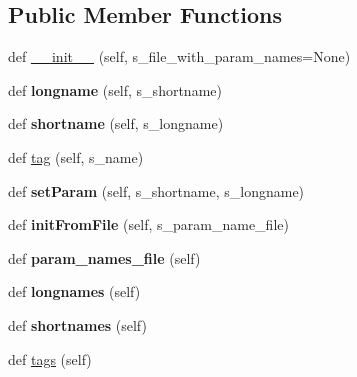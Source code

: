 \subsection*{Public Member Functions}
\begin{DoxyCompactItemize}
\item 
def \hyperlink{classnegui_1_1pgparamset_1_1PGParamSet_a598ea6a166f56fe5be01f86d4d8c91ba}{\+\_\+\+\_\+init\+\_\+\+\_\+} (self, s\+\_\+file\+\_\+with\+\_\+param\+\_\+names=None)
\item 
def {\bfseries longname} (self, s\+\_\+shortname)\hypertarget{classnegui_1_1pgparamset_1_1PGParamSet_abd1a46443b4e561987cf6bcab117154e}{}\label{classnegui_1_1pgparamset_1_1PGParamSet_abd1a46443b4e561987cf6bcab117154e}

\item 
def {\bfseries shortname} (self, s\+\_\+longname)\hypertarget{classnegui_1_1pgparamset_1_1PGParamSet_a76253dd1f3b11521fa0bb18f43aaa70d}{}\label{classnegui_1_1pgparamset_1_1PGParamSet_a76253dd1f3b11521fa0bb18f43aaa70d}

\item 
def \hyperlink{classnegui_1_1pgparamset_1_1PGParamSet_aef97e7ee992a99258a6bbd7b7bf7c5fe}{tag} (self, s\+\_\+name)
\item 
def {\bfseries set\+Param} (self, s\+\_\+shortname, s\+\_\+longname)\hypertarget{classnegui_1_1pgparamset_1_1PGParamSet_afa75a44a1457df0a657f444fb2a7d52d}{}\label{classnegui_1_1pgparamset_1_1PGParamSet_afa75a44a1457df0a657f444fb2a7d52d}

\item 
def {\bfseries init\+From\+File} (self, s\+\_\+param\+\_\+name\+\_\+file)\hypertarget{classnegui_1_1pgparamset_1_1PGParamSet_a0d0286ee3d7b8a845db793ca9a299efc}{}\label{classnegui_1_1pgparamset_1_1PGParamSet_a0d0286ee3d7b8a845db793ca9a299efc}

\item 
def {\bfseries param\+\_\+names\+\_\+file} (self)\hypertarget{classnegui_1_1pgparamset_1_1PGParamSet_a8d8478fc187d4c04e3a3c1093f7834be}{}\label{classnegui_1_1pgparamset_1_1PGParamSet_a8d8478fc187d4c04e3a3c1093f7834be}

\item 
def {\bfseries longnames} (self)\hypertarget{classnegui_1_1pgparamset_1_1PGParamSet_a27bf393c0d8052647b19eac34495f06b}{}\label{classnegui_1_1pgparamset_1_1PGParamSet_a27bf393c0d8052647b19eac34495f06b}

\item 
def {\bfseries shortnames} (self)\hypertarget{classnegui_1_1pgparamset_1_1PGParamSet_a0418157edbb31cc2282210baca66a35d}{}\label{classnegui_1_1pgparamset_1_1PGParamSet_a0418157edbb31cc2282210baca66a35d}

\item 
def \hyperlink{classnegui_1_1pgparamset_1_1PGParamSet_a292c23c3d6349027f5c19eec70ea34f8}{tags} (self)
\end{DoxyCompactItemize}


